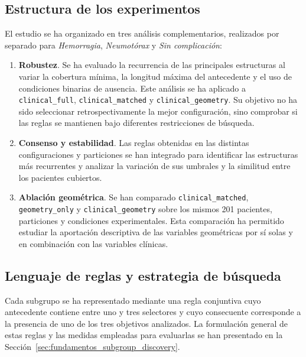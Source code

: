 \subsection{Estructura de los experimentos}

El estudio se ha organizado en tres análisis complementarios, realizados por separado para \textit{Hemorragia}, \textit{Neumotórax} y \textit{Sin complicación}:

\begin{enumerate}
    \item \textbf{Robustez}. Se ha evaluado la recurrencia de las principales estructuras al variar la cobertura mínima, la longitud máxima del antecedente y el uso de condiciones binarias de ausencia. Este análisis se ha aplicado a \texttt{clinical\_full}, \texttt{clinical\_matched} y \texttt{clinical\_geometry}. Su objetivo no ha sido seleccionar retrospectivamente la mejor configuración, sino comprobar si las reglas se mantienen bajo diferentes restricciones de búsqueda.

    \item \textbf{Consenso y estabilidad}. Las reglas obtenidas en las distintas configuraciones y particiones se han integrado para identificar las estructuras más recurrentes y analizar la variación de sus umbrales y la similitud entre los pacientes cubiertos.

    \item \textbf{Ablación geométrica}. Se han comparado \texttt{clinical\_matched}, \texttt{geometry\_only} y \texttt{clinical\_geometry} sobre los mismos 201 pacientes, particiones y condiciones experimentales. Esta comparación ha permitido estudiar la aportación descriptiva de las variables geométricas por sí solas y en combinación con las variables clínicas.
\end{enumerate}


\subsection{Lenguaje de reglas y estrategia de búsqueda}

Cada subgrupo se ha representado mediante una regla conjuntiva cuyo antecedente contiene entre uno y tres selectores y cuyo consecuente corresponde a la presencia de uno de los tres objetivos analizados. La formulación general de estas reglas y las medidas empleadas para evaluarlas se han presentado en la Sección~\ref{sec:fundamentos_subgroup_discovery}.

